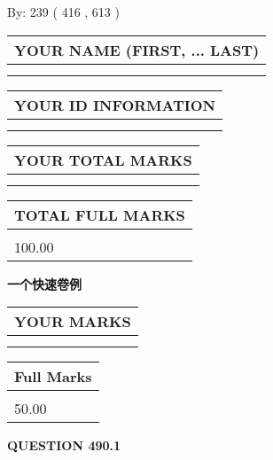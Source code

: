 \documentclass{ctexart}
\begin{document}
   
\hspace{1.0in} By: 
 239 ( 416 ,  613 )
   
   
   
   
\newpage 
\setcounter{page}{ 
   490001 } 
   
   
   
   
\noindent\begin{tabular}{|l|}
\hline
YOUR NAME (FIRST, ... LAST)  \\
\hline
 \\ 
 \\ 
\hline
\end{tabular}
\hspace{0.05in} \begin{tabular}{|l|}
\hline
 YOUR   ID   INFORMATION  \\
\hline
 \\ 
 \\ 
\hline
\end{tabular}
   
   
\vspace{0.2in}\noindent\begin{tabular}{|l|}
\hline
YOUR TOTAL MARKS  \\
\hline
 \\ 
 \\ 
\hline
\end{tabular}
\hspace{0.05in} \begin{tabular}{|l|}
\hline
TOTAL FULL MARKS  \\
\hline
 \\ 
100.00 \\
\hline
\end{tabular}
   
   
 \vspace{0.2in}
{\LARGE {\textbf{ 一个快速卷例}}}
   
   
  
\vspace{0.2in}
  
\noindent\begin{tabular}{|l|}
\hline
 YOUR MARKS  \\
\hline
 \\ 
 \\ 
\hline
\end{tabular}
\hspace{0.05in} \begin{tabular}{|l|}
\hline
 Full Marks  \\
\hline
 \\ 
50.00 \\
\hline
\end{tabular}
{\textbf{\Large{QUESTION
490.1 
}}}
  
\end{document}
